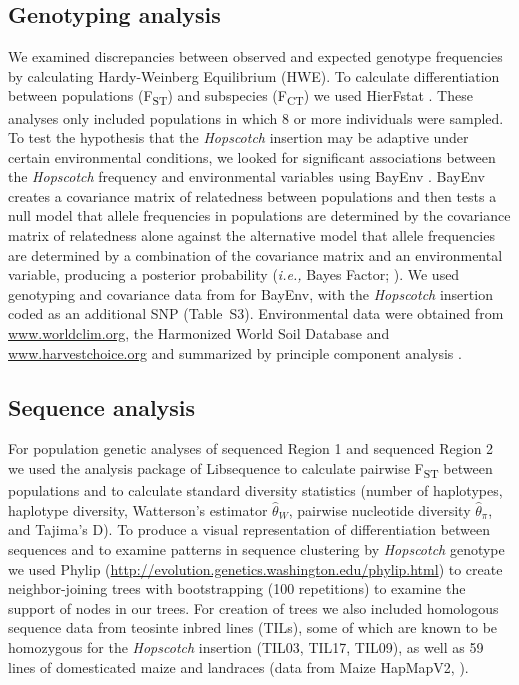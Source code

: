\documentclass[11pt]{article}
\begin{document}
\begin{linenumbers}
\begin{flushleft}
\subsection*{Genotyping analysis}

We examined discrepancies between observed and expected genotype frequencies by calculating Hardy-Weinberg Equilibrium (HWE).  To calculate differentiation between populations (F\textsubscript{ST}) and subspecies (F\textsubscript{CT}) we used HierFstat \citep{Goudet2005}. These analyses only included populations in which 8 or more individuals were sampled. To test the hypothesis that the \emph{Hopscotch} insertion may be adaptive under certain environmental conditions, we looked for significant associations between the \emph{Hopscotch} frequency and environmental variables using BayEnv \citep{Coop2010}. BayEnv creates a covariance matrix of relatedness between populations and then tests a null model that allele frequencies in populations are determined by the covariance matrix of relatedness alone against the alternative model that allele frequencies are determined by a combination of the covariance matrix and an environmental variable, producing a posterior probability (\emph{i.e.,} Bayes Factor; \citealt{Coop2010}). We used genotyping and covariance data from \citet{Pyhajarvi2013} for BayEnv, with the \emph{Hopscotch} insertion coded as an additional SNP (Table~S3). Environmental data were obtained from \url{www.worldclim.org}, the Harmonized World Soil Database \citep{FAOHWSD} and \url{www.harvestchoice.org} and summarized by principle component analysis \citep{Pyhajarvi2013}.

\subsection*{Sequence analysis}

For population genetic analyses of sequenced Region 1 and sequenced Region 2 we used the analysis package of Libsequence \citep{Thornton2003} to calculate pairwise F\textsubscript{ST} between populations and to calculate standard diversity statistics (number of haplotypes, haplotype diversity, Watterson's estimator $\hat\theta_W$, pairwise nucleotide diversity $\hat\theta_\pi$, and Tajima's D). To produce a visual representation of differentiation between sequences and to examine patterns in sequence clustering by \emph{Hopscotch} genotype we used Phylip (\url{http://evolution.genetics.washington.edu/phylip.html}) to create neighbor-joining trees with bootstrapping (100 repetitions) to examine the support of nodes in our trees. For creation of trees we also included homologous sequence data from teosinte inbred lines (TILs), some of which are known to be homozygous for the \emph{Hopscotch} insertion (TIL03, TIL17, TIL09), as well as 59 lines of domesticated maize and landraces (data from Maize HapMapV2, \citealt{Chia2012}).


\end{flushleft}
\end{linenumbers}
\end{document}

